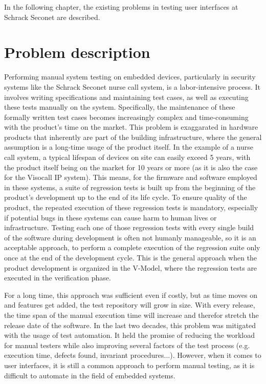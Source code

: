 \documentclass[Proposal,BIC,english,IEEE]{BASE/twbook} %
\begin{document}
In the following chapter, the existing problems in testing user interfaces at Schrack Seconet are described.

\newpage
\pagestyle{ExperienceFromAuthor}
\chapter{Problem description}
Performing manual system testing on embedded devices, particularly in security systems like the Schrack Seconet nurse call system, is a labor-intensive process. It involves writing specifications and maintaining test cases, as well as executing these tests manually on the system. Specifically, the maintenance of these formally written test cases becomes increasingly complex and time-consuming with the product's time on the market. This problem is exaggarated in hardware products that inherently are part of the building infrastructure, where the general assumption is a long-time usage of the product itself. In the example of a nurse call system, a typical lifespan of devices on site can easily exceed 5 years, with the product itself being on the market for 10 years or more (as it is also the case for the Visocall IP system\autocite{VisocallIPModerne}).
This means, for the firmware and software employed in these systems, a suite of regression tests is built up from the beginning of the product's development up to the end of its life cycle. To ensure quality of the product, the repeated execution of these regression tests is mandatory, especially if potential bugs in these systems can cause harm to human lives or infrastructure.
Testing each one of those regression tests with every single build of the software during development is often not humanly manageable, so it is an acceptable approach, to perform a complete execution of the regression suite only once at the end of the development cycle. This is the general approach when the product development is organized in the V-Model, where the regression tests are executed in the verification phase.

For a long time, this approach was sufficient even if costly, but as time moves on and features get added, the test repository will grow in size. With every release, the time span of the manual execution time will increase and therefor stretch the release date of the software.
In the last two decades, this problem was mitigated with the usage of test automation. It held the promise of reducing the workload for manual testers while also improving several factors of the test process (e.g. execution time, defects found, invariant procedures...).
However, when it comes to user interfaces, it is still a common approach to perform manual testing, as it is difficult to automate in the field of embedded systems.
\end{document}
